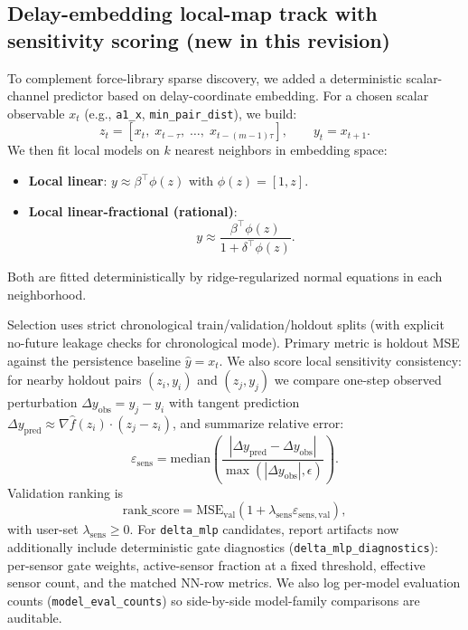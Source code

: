 \documentclass[11pt]{article}
\begin{document}
\subsection{Delay-embedding local-map track with sensitivity scoring (new in this revision)}
To complement force-library sparse discovery, we added a deterministic scalar-channel predictor based on delay-coordinate embedding\cite{Takens1981}. For a chosen scalar observable $x_t$ (e.g., \texttt{a1\_x}, \texttt{min\_pair\_dist}), we build:
\begin{equation*}
z_t=[x_t,\;x_{t-\tau},\;\dots,\;x_{t-(m-1)\tau}],\qquad y_t=x_{t+1}.
\end{equation*}
We then fit local models on $k$ nearest neighbors in embedding space:
\begin{itemize}
\item \textbf{Local linear}: $y\approx \beta^\top \phi(z)$ with $\phi(z)=[1,z]$.
\item \textbf{Local linear-fractional (rational)}:
\begin{equation*}
y\approx \frac{\beta^\top \phi(z)}{1+\delta^\top \phi(z)}.
\end{equation*}
\end{itemize}
Both are fitted deterministically by ridge-regularized normal equations in each neighborhood.

Selection uses strict chronological train/validation/holdout splits (with explicit no-future leakage checks for chronological mode). Primary metric is holdout MSE against the persistence baseline $\hat{y}=x_t$. We also score local sensitivity consistency: for nearby holdout pairs $(z_i,y_i)$ and $(z_j,y_j)$ we compare one-step observed perturbation $\Delta y_{\mathrm{obs}}=y_j-y_i$ with tangent prediction $\Delta y_{\mathrm{pred}}\approx \nabla \hat{f}(z_i)\cdot(z_j-z_i)$, and summarize relative error:
\begin{equation*}
\varepsilon_{\mathrm{sens}}=\mathrm{median}\left(\frac{|\Delta y_{\mathrm{pred}}-\Delta y_{\mathrm{obs}}|}{\max(|\Delta y_{\mathrm{obs}}|,\epsilon)}\right).
\end{equation*}
Validation ranking is
\begin{equation*}
\mathrm{rank\_score}=\mathrm{MSE}_{\mathrm{val}}\left(1+\lambda_{\mathrm{sens}}\varepsilon_{\mathrm{sens,val}}\right),
\end{equation*}
with user-set $\lambda_{\mathrm{sens}}\ge 0$.
For \texttt{delta\_mlp} candidates, report artifacts now additionally include deterministic gate diagnostics (\texttt{delta\_mlp\_diagnostics}): per-sensor gate weights, active-sensor fraction at a fixed threshold, effective sensor count, and the matched NN-row metrics. We also log per-model evaluation counts (\texttt{model\_eval\_counts}) so side-by-side model-family comparisons are auditable.
\end{document}
